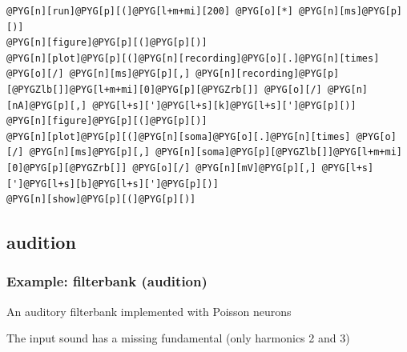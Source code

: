 \documentclass[letterpaper,10pt,english]{manual}
\begin{document}
\begin{Verbatim}[commandchars=@\[\]]
@PYG[n][run]@PYG[p][(]@PYG[l+m+mi][200] @PYG[o][*] @PYG[n][ms]@PYG[p][)]
@PYG[n][figure]@PYG[p][(]@PYG[p][)]
@PYG[n][plot]@PYG[p][(]@PYG[n][recording]@PYG[o][.]@PYG[n][times] @PYG[o][/] @PYG[n][ms]@PYG[p][,] @PYG[n][recording]@PYG[p][@PYGZlb[]]@PYG[l+m+mi][0]@PYG[p][@PYGZrb[]] @PYG[o][/] @PYG[n][nA]@PYG[p][,] @PYG[l+s][']@PYG[l+s][k]@PYG[l+s][']@PYG[p][)]
@PYG[n][figure]@PYG[p][(]@PYG[p][)]
@PYG[n][plot]@PYG[p][(]@PYG[n][soma]@PYG[o][.]@PYG[n][times] @PYG[o][/] @PYG[n][ms]@PYG[p][,] @PYG[n][soma]@PYG[p][@PYGZlb[]]@PYG[l+m+mi][0]@PYG[p][@PYGZrb[]] @PYG[o][/] @PYG[n][mV]@PYG[p][,] @PYG[l+s][']@PYG[l+s][b]@PYG[l+s][']@PYG[p][)]
@PYG[n][show]@PYG[p][(]@PYG[p][)]
\end{Verbatim}


\subsection{audition}

\resetcurrentobjects
\hypertarget{--doc-examples-audition_filterbank}{}

\hypertarget{index-19}{}\subsubsection{Example: filterbank (audition)}

An auditory filterbank implemented with Poisson neurons

The input sound has a missing fundamental (only harmonics 2 and 3)
\end{document}

